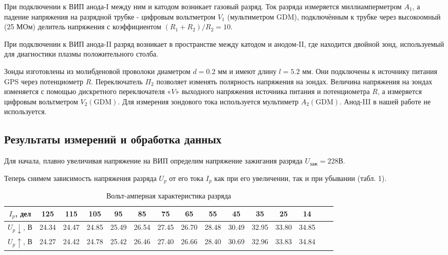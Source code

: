 \documentclass[12pt,a4paper]{article}
\begin{document}
При подключении к ВИП анода-I между ним и катодом возникает газовый разряд. 
Ток разряда измеряется миллиамперметром $A_{1}$, а падение напряжения на разрядной трубке - цифровым вольтметром $V_{1}$ (мультиметром GDM), подключённым к трубке через высокоомный (25 МОм) делитель напряжения с коэффициентом $\left(R_{1}+R_{2}\right) / R_{2}=10$.

При подключении к ВИП анода-II разряд возникает в пространстве между катодом и анодом-II, где находится двойной зонд, используемый для диагностики плазмы положительного столба.

Зонды изготовлены из молибденовой проволоки диаметром $d=0.2$ мм и имеют длину $l=5.2$ мм. 
Они подключены к источнику питания GPS через потенциометр $R$. 
Переключатель $\Pi_{2}$ позволяет изменять полярность напряжения на зондах. 
Величина напряжения на зондах изменяется с помощью дискретного переключателя «$V$» выходного напряжения источника питания и потенциометра $R$, а измеряется цифровым вольтметром $V_{2}(\mathrm{GDM})$. 
Для измерения зондового тока используется мультиметр $A_{2}(\mathrm{GDM})$. 
Анод-III в нашей работе не используется. 

\subsection*{Результаты измерений и обработка данных}
Для начала, плавно увеличивая напряжение на ВИП определим напряжение зажигания разряда $U_{заж} = 228В$.

Теперь снимем зависимость напряжения разряда $U_p$ от его тока $I_p$ как при его увеличении, так и при убывании (табл. 1).
\begin{table}[H]
    \centering
    \begin{tabular}[]{|c|c|c|c|c|c|c|c|c|c|c|c|c|c|c|}
        \hline
        $I_p$, дел &125&115&105&95&85&75&65&55&45&35&25&14\\
        \hline
        $U_p\downarrow$, В &24.34&24.47&24.85&25.49&26.54&27.45&26.70&28.48&30.49&32.95&33.80&34.85\\
        \hline
        $U_p\uparrow$, В &24.27&24.42&24.78&25.42&26.46&27.40&26.66&28.40&30.69&32.96&33.83&34.84\\
        \hline
    \end{tabular}
    \caption{Вольт-амперная характеристика разряда}
\end{table}
\end{document}
